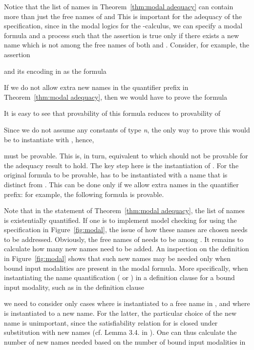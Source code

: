 \documentclass{acmtrans2m}
\newcommand{\name}{\hbox{\sl n}}
\begin{document}
Notice that the list of names  in Theorem~\ref{thm:modal adequacy}
can contain more than just the free names of  and 
This is important for the adequacy of the specification, since in the modal
logics for the -calculus, we can specify a modal formula  and a process 
 such that the assertion  is true only if 
there exists a new name which is not among the free names of both 
and . Consider, for example, the assertion

and its encoding in  as the formula

If we do not allow extra new names in the quantifier prefix
in Theorem~\ref{thm:modal adequacy}, then we would have to
prove the formula

It is easy to see that provability of this formula reduces to
provability of

Since we do not assume any constants of type \name, the only way to prove
this would be to instantiate  with , hence, 

must be provable.  This is, in turn, equivalent to  which should not be 
provable for the adequacy result to hold. 
The key step here is the instantiation of . For the original formula
to be provable,  has to be instantiated with a name that is
distinct from .  This can be done only if we allow extra names
in the quantifier prefix: for example, the following formula is provable.


Note that in the statement of Theorem~\ref{thm:modal adequacy}, the list of names 
is existentially quantified. If one is to implement model checking for  using
the specification in Figure~\ref{fig:modal}, the issue of how these names are chosen needs to
be addressed. Obviously, the free names of  needs to be among .
It remains to calculate how many new names need to be added.
An inspection on the definition in Figure~\ref{fig:modal} shows that such 
new names may be needed only when bound input modalities are present in the modal formula.
More specifically, when instantiating the name quantification ( or ) in 
a definition clause for a bound input modality, such as in the definition clause

we need to consider only cases where  is instantiated to a free name in ,
and where  is instantiated to a new name. For the latter, the particular choice of the new name 
is unimportant, since the satisfiability relation for  is closed under substitution 
with new names (cf. Lemma 3.4. in \cite{milner93tcs}). 
One can thus calculate the number of new names needed based on the number of bound 
input modalities in 
\end{document}
